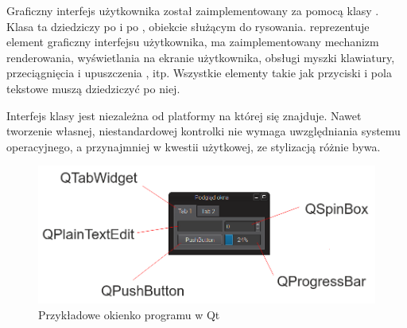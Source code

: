 \par
Graficzny interfejs użytkownika został zaimplementowany za pomocą klasy .
Klasa ta dziedziczy po  i po , obiekcie służącym do rysowania.
 reprezentuje element graficzny interfejsu użytkownika, ma zaimplementowany mechanizm renderowania, wyświetlania na ekranie użytkownika, obsługi myszki klawiatury, przeciągnięcia i upuszczenia , itp.
Wszystkie elementy takie jak przyciski i pola tekstowe muszą dziedziczyć po niej.
\par
Interfejs klasy jest niezależna od platformy na której się znajduje.
Nawet tworzenie własnej, niestandardowej kontrolki nie wymaga uwzględniania systemu operacyjnego, a przynajmniej w kwestii użytkowej, ze stylizacją różnie bywa.

\begin{figure}[!htbp]
    \centering
    \includegraphics[width=\textwidth]{img/qt-gui-001.png}
    \caption{Przykładowe okienko programu w Qt}
    \label{fig:qtgui1}
\end{figure}

